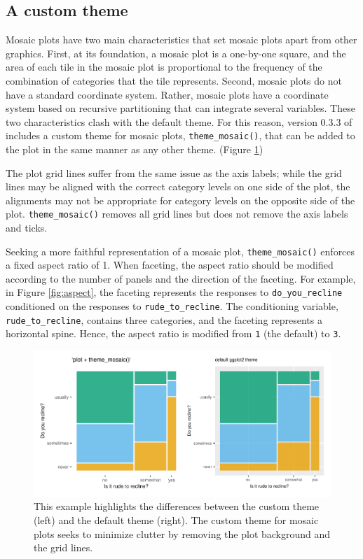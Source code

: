 \hypertarget{a-custom-theme}{%
\subsection{A custom theme}\label{a-custom-theme}}

Mosaic plots have two main characteristics that set mosaic plots apart from other graphics. First, at its foundation, a mosaic plot is a one-by-one square, and the area of each tile in the mosaic plot is proportional to the frequency of the combination of categories that the tile represents. Second, mosaic plots do not have a standard coordinate system. Rather, mosaic plots have a coordinate system based on recursive partitioning that can integrate several variables. These two characteristics clash with the default  theme. For this reason, version 0.3.3 of  includes a custom theme for mosaic plots, \texttt{theme\_mosaic()}, that can be added to the plot in the same manner as any other  theme. (Figure \ref{fig:themes})

The plot grid lines suffer from the same issue as the axis labels; while the grid lines may be aligned with the
correct category levels on one side of the plot, the alignments may not be appropriate for category levels on the opposite side of the plot. \texttt{theme\_mosaic()} removes all grid lines but does not remove the axis labels and ticks.

Seeking a more faithful representation of a mosaic plot, \texttt{theme\_mosaic()} enforces a fixed aspect ratio of 1. When faceting, the aspect ratio should be modified according to the number of panels and the direction of the faceting. For example, in Figure \ref{fig:aspect}, the faceting represents the responses to \texttt{do\_you\_recline} conditioned on the responses to \texttt{rude\_to\_recline}. The conditioning variable, \texttt{rude\_to\_recline}, contains three categories, and the faceting represents a horizontal spine. Hence, the aspect ratio is modified from \texttt{1} (the default) to \texttt{3}.

\begin{figure}

{\centering \includegraphics[width=1\linewidth]{RJ-2023-013_files/figure-latex/themes-1} 

}

\caption{This example highlights the differences between the custom theme (left) and the default theme (right). The custom theme for mosaic plots seeks to minimize clutter by removing the plot background and the grid lines.}\label{fig:themes}
\end{figure}

